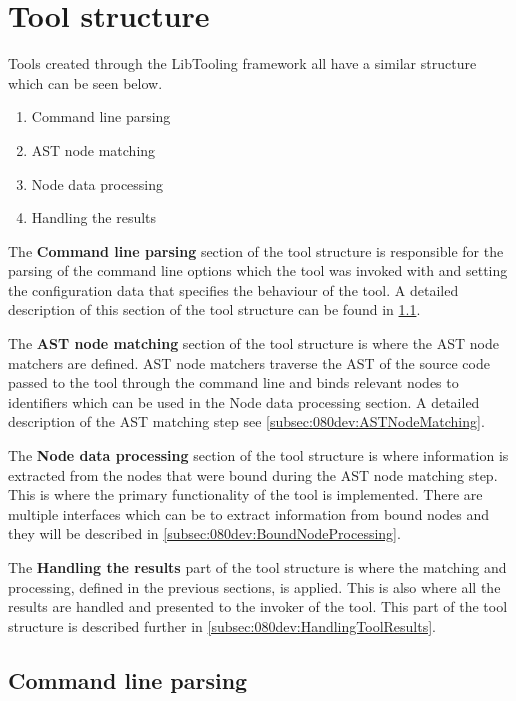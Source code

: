 \section{Tool structure}

Tools created through the LibTooling framework all have a similar structure which can be seen below.   

\begin{enumerate}
    \item Command line parsing
    \item AST node matching
    \item Node data processing
    \item Handling the results
\end{enumerate}

The \textbf{Command line parsing} section of the tool structure is responsible for the parsing of the command line options which the tool was invoked with and setting the configuration data that specifies the behaviour of the tool. A detailed description of this section of the tool structure can be found in \cref{subsec:080dev:CMDLineParsing}.

The \textbf{AST node matching} section of the tool structure is where the AST node matchers are defined. AST node matchers traverse the AST of the source code passed to the tool through the command line and binds relevant nodes to identifiers which can be used in the Node data processing section. A detailed description of the AST matching step see \cref{subsec:080dev:ASTNodeMatching}.

The \textbf{Node data processing} section of the tool structure is where information is extracted from the nodes that were bound during the AST node matching step. This is where the primary functionality of the tool is implemented. There are multiple interfaces which can be to extract information from bound nodes and they will be described in \cref{subsec:080dev:BoundNodeProcessing}.

The \textbf{Handling the results} part of the tool structure is where the matching and processing, defined in the previous sections, is applied. This is also where all the results are handled and presented to the invoker of the tool. This part of the tool structure is described further in \cref{subsec:080dev:HandlingToolResults}.


\subsection{Command line parsing} \label{subsec:080dev:CMDLineParsing}

